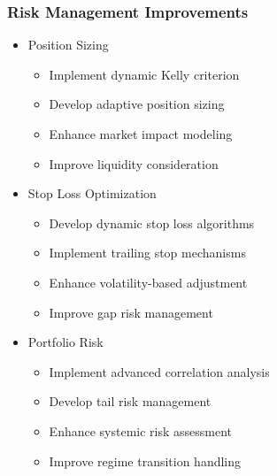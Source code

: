 \documentclass[conference]{IEEEtran}
\begin{document}
\subsubsection{Risk Management Improvements}
\begin{itemize}
    \item Position Sizing
    \begin{itemize}
        \item Implement dynamic Kelly criterion
        \item Develop adaptive position sizing
        \item Enhance market impact modeling
        \item Improve liquidity consideration
    \end{itemize}
    
    \item Stop Loss Optimization
    \begin{itemize}
        \item Develop dynamic stop loss algorithms
        \item Implement trailing stop mechanisms
        \item Enhance volatility-based adjustment
        \item Improve gap risk management
    \end{itemize}
    
    \item Portfolio Risk
    \begin{itemize}
        \item Implement advanced correlation analysis
        \item Develop tail risk management
        \item Enhance systemic risk assessment
        \item Improve regime transition handling
    \end{itemize}
\end{itemize}
\end{document}
